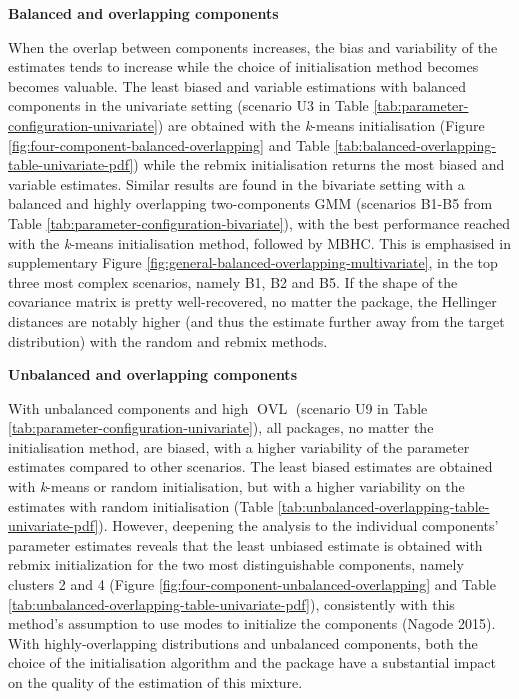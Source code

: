 \textbf{Balanced and overlapping components}

When the overlap between components increases, the bias and variability of the estimates tends to increase while the choice of initialisation method becomes becomes valuable.
The least biased and variable estimations with balanced components in the univariate setting (scenario U3 in Table
\ref{tab:parameter-configuration-univariate}) are obtained with
the \emph{k}-means initialisation (Figure
\ref{fig:four-component-balanced-overlapping} and Table
\ref{tab:balanced-overlapping-table-univariate-pdf}) while
the rebmix initialisation returns the most biased and variable
estimates. Similar results are found in the bivariate setting with a balanced and highly overlapping two-components GMM (scenarios B1-B5 from Table \ref{tab:parameter-configuration-bivariate}), with the best performance reached with the \emph{k}-means initialisation method, followed by MBHC. This is emphasised in supplementary Figure \ref{fig:general-balanced-overlapping-multivariate}, in the top three most complex scenarios, namely B1, B2 and B5. If the shape of the covariance matrix is pretty well-recovered, no matter the package, the Hellinger distances are notably higher (and thus the estimate further away from the target distribution) with the random and rebmix methods.

\textbf{Unbalanced and overlapping components}

With unbalanced components and high \(\operatorname{OVL}\) (scenario U9 in Table
\ref{tab:parameter-configuration-univariate}), all packages, no
matter the initialisation method, are biased, with a higher variability
of the parameter estimates compared to other scenarios. The least biased
estimates are obtained with \emph{k}-means or random initialisation, but with
a higher variability on the estimates with random initialisation (Table
\ref{tab:unbalanced-overlapping-table-univariate-pdf}).
However, deepening the analysis to the individual components' parameter estimates
reveals that the least unbiased estimate is obtained with rebmix initialization
for the two most distinguishable components, namely clusters 2 and 4 (Figure \ref{fig:four-component-unbalanced-overlapping} and
Table
\ref{tab:unbalanced-overlapping-table-univariate-pdf}), consistently with this method's assumption to use modes to initialize the components (Nagode 2015). With highly-overlapping distributions and unbalanced components, both the choice of the initialisation algorithm and the package have a
substantial impact on the quality of the estimation of this mixture.

